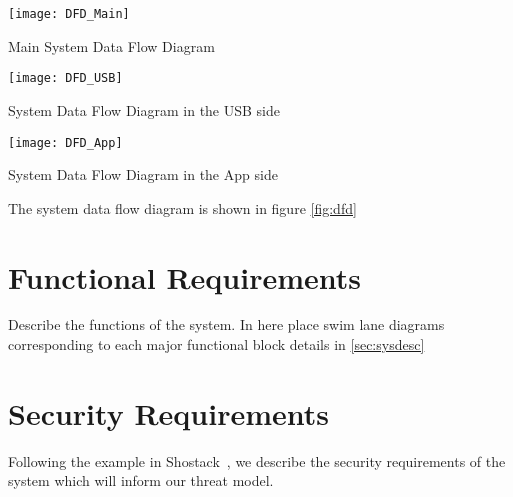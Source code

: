 \begin{marginfigure}
    \centering
    \texttt{[image: DFD\_Main]}
    \caption{Main System Data Flow Diagram}
    \label{fig:dfd}
\end{marginfigure}
\begin{marginfigure}
    \centering
    \texttt{[image: DFD\_USB]}
    \caption{System Data Flow Diagram in the USB side}
    \label{fig:dfd}
\end{marginfigure}
\begin{marginfigure}
    \centering
    \texttt{[image: DFD\_App]}
    \caption{System Data Flow Diagram in the App side}
    \label{fig:dfd}
\end{marginfigure}

The system data flow diagram is shown in figure \ref{fig:dfd}

\section{Functional Requirements}
\label{sec:funcreq}
Describe the functions of the system.  In here place swim lane
diagrams corresponding to each major functional block details in
\ref{sec:sysdesc}

\section{Security Requirements}
\label{sec:secreqs}
Following the example in Shostack~\cite{shostackbook}, we describe the
security requirements of the system which will inform our threat
model.
